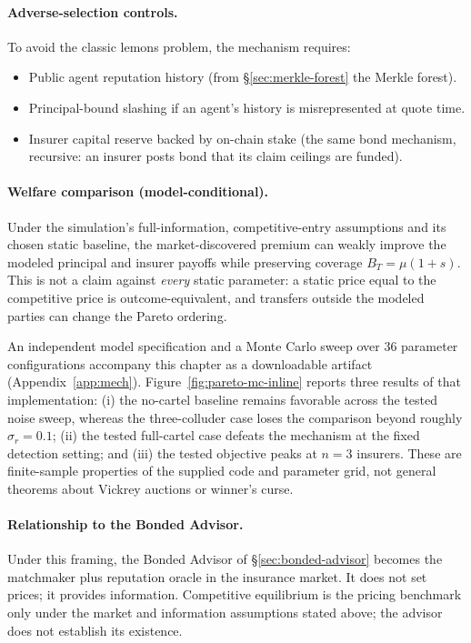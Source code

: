 \documentclass[11pt,a4paper]{article}
\theoremstyle{definition}
\theoremstyle{remark}
\begin{document}
\paragraph{Adverse-selection controls.}
To avoid the classic lemons problem, the mechanism requires:
\begin{itemize}[nosep]
  \item Public agent reputation history (from \S\ref{sec:merkle-forest} the Merkle forest).
  \item Principal-bound slashing if an agent's history is misrepresented at quote time.
  \item Insurer capital reserve backed by on-chain stake (the same bond mechanism, recursive: an insurer posts bond that its claim ceilings are funded).
\end{itemize}

\paragraph{Welfare comparison (model-conditional).}\label{sec:youle:welfare}
Under the simulation's full-information, competitive-entry assumptions and its chosen static baseline, the market-discovered premium can weakly improve the modeled principal and insurer payoffs while preserving coverage $B_T=\mu(1+s)$. This is not a claim against \emph{every} static parameter: a static price equal to the competitive price is outcome-equivalent, and transfers outside the modeled parties can change the Pareto ordering.


An independent model specification and a Monte Carlo sweep over 36 parameter configurations accompany this chapter as a downloadable artifact (Appendix~\ref{app:mech}). Figure~\ref{fig:pareto-mc-inline} reports three results of that implementation: (i) the no-cartel baseline remains favorable across the tested noise sweep, whereas the three-colluder case loses the comparison beyond roughly $\sigma_r=0.1$; (ii) the tested full-cartel case defeats the mechanism at the fixed detection setting; and (iii) the tested objective peaks at $n=3$ insurers. These are finite-sample properties of the supplied code and parameter grid, not general theorems about Vickrey auctions or winner's curse.



\paragraph{Relationship to the Bonded Advisor.}
Under this framing, the Bonded Advisor of \S\ref{sec:bonded-advisor} becomes the matchmaker plus reputation oracle in the insurance market. It does not set prices; it provides information. Competitive equilibrium is the pricing benchmark only under the market
and information assumptions stated above; the advisor does not establish
its existence.
\end{document}
